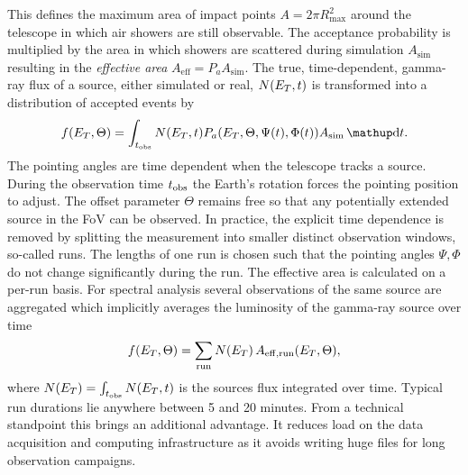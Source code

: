 This defines the maximum area of impact points $A = 2 \pi R_{\mathrm{max}}^2$ around the telescope in which air showers are still observable.
The acceptance probability is multiplied by the area in which showers are scattered during simulation $A_{\mathrm{sim}}$ resulting 
in the \emph{effective area} $A_\mathrm{eff} = P_a A_{\mathrm{sim}}$.
The true, time-dependent, gamma-ray flux of a source, either simulated or real, $N(E_T, t)$ is transformed into a distribution of accepted events by 
\begin{equation}
  \label{eq:f_E}
  f(\etrue, \Theta) = \int_{\tobs} N(\etrue, t) P_a(\etrue, \Theta, \Psi(t), \Phi(t)) A_{\mathrm{sim}} \diff{t}.
\end{equation} 
The pointing angles are time dependent when the telescope tracks a source. 
During the observation time $t_{\text{obs}}$ the Earth's rotation forces the pointing position to adjust. 
The offset parameter $\Theta$ remains free so that any potentially extended source in the FoV can be observed.
In practice, the explicit time dependence is removed by splitting the measurement into smaller distinct observation windows, so-called runs.
The lengths of one run is chosen such that the pointing angles $\Psi, \Phi$ do not change significantly during the run.
The effective area is calculated on a per-run basis.
For spectral analysis several observations of the same source are aggregated which 
implicitly averages the luminosity of the gamma-ray source over time
\begin{equation}
  \label{eq:f_E_discrete}
  f(E_T, \Theta) = \sum_{\mathrm{run}} N(E_T)\, A_{\mathrm{eff}, \mathrm{run}}(E_T, \Theta),
\end{equation}
where $N(E_T)=\int_{t_{\text{obs}}}N(E_T, t)$ is the sources flux integrated over time.
Typical run durations lie anywhere between 5 and 20 minutes. 
From a technical standpoint this brings an additional advantage. It reduces load on the data acquisition and computing infrastructure as it avoids writing huge 
files for long observation campaigns. 

